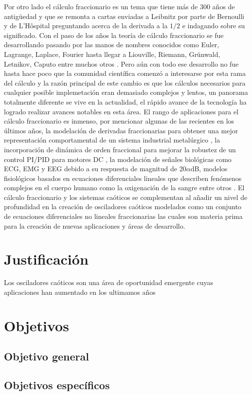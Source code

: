 	Por otro lado el cálculo fraccionario es un tema que tiene más de 300 años de antigüedad y que se remonta a cartas enviadas a Leibnitz por parte de Bernoulli y de L'Hôspital preguntando acerca de la derivada a la $1/2$ e indagando sobre su significado. Con el paso de los años la teoría de cálculo fraccionario se fue desarrollando pasando por las manos de nombres conocidos como Euler, Lagrange, Laplace, Fourier hasta llegar a Liouville, Riemann, Grünwald, Letnikov, Caputo entre muchos otros \cite{Petras2011}. Pero aún con todo ese desarrollo no fue hasta hace poco que la comunidad científica comenzó a interesarse por esta rama del cálculo y la razón principal de este cambio es que los cálculos necesarios para cualquier posible implemetación eran demasiado complejos y lentos, un panorama totalmente diferente se vive en la actualidad, el rápido avance de la tecnología ha logrado realizar avances notables en esta área. El rango de aplicaciones para el cálculo fraccionario es inmenso, por mencionar algunas de las recientes en los últimos años, la modelación de derivadas fraccionarias para obtener una mejor representación comportamental de un sistema industrial metalúrgico \cite{Petras2019}, la incorporación de dinámica de orden fraccional para mejorar la robustez de un control PI/PID para motores DC \cite{Tepljakov2016,Khubalkar2018}, la modelación de señales biológicas como ECG, EMG y EEG debido a su respuesta de magnitud de 20$\alpha$dB, modelos fisiológicos basados en ecuaciones diferenciales lineales que describen fenómenos complejos en el cuerpo humano como la oxigenación de la sangre entre otros \cite{Ortigueira2011}.
	El cálculo fraccionario y los sistemas caóticos se complementan al añadir un nivel de profundidad en la creación de osciladores caóticos modelados como un conjunto de ecuaciones diferenciales no lineales fraccionarias las cuales son materia prima para la creación de nuevas aplicaciones y áreas de desarrollo. 
	
	\section{Justificación}
	
	Los osciladores caóticos son una área de oportunidad emergente cuyas aplicaciones han aumentado en los ultimamos años
	\section{Objetivos}
	
		\subsection{Objetivo general}
		
		\subsection{Objetivos específicos}
	